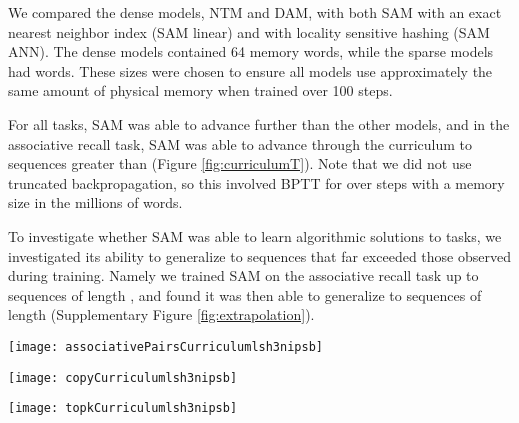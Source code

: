 \documentclass{article}
\begin{document}
We compared the dense models, NTM and DAM, with both SAM with an exact nearest neighbor index (SAM linear) and with locality sensitive hashing (SAM ANN). The dense models contained 64 memory words, while the sparse models had  words. These sizes were chosen to ensure all models use approximately the same amount of physical memory when trained over 100 steps.







For all tasks, SAM was able to advance further than the other models, and in the associative recall task, SAM was able to advance through the curriculum to sequences greater than  (Figure \ref{fig:curriculumT}). Note that we did not use truncated backpropagation, so this involved BPTT for over  steps with a memory size in the millions of words.



To investigate whether SAM was able to learn algorithmic solutions to tasks, we investigated its ability to generalize to sequences that far exceeded those observed during training. Namely we trained SAM on the associative recall task up to sequences of length , and found it was then able to generalize to sequences of length  (Supplementary Figure  \ref{fig:extrapolation}). 











\begin{figure*}[h]
\begin{minipage}[h]{0.32\textwidth}
        \centering
\texttt{[image: associativePairsCurriculumlsh3nipsb]}
        \subcaption{\label{sf:apc}}
    \end{minipage} \begin{minipage}[h]{0.32\textwidth}
        \centering
\texttt{[image: copyCurriculumlsh3nipsb]}
        \subcaption{\label{sf:cc}}
    \end{minipage} \begin{minipage}[h]{0.32\textwidth}
        \centering
\texttt{[image: topkCurriculumlsh3nipsb]}
        \subcaption{\label{sf:topkc}}
    \end{minipage}
    \\
    \caption{Curriculum training curves for sparse and dense models on () Associative recall, () Copy, and () Priority sort. Difficulty level indicates the task difficulty (e.g. the length of sequence for copy). We see SAM train (and backpropagate over) episodes with thousands of steps, and tasks which require thousands of words to be stored to memory. Each model is averaged across 5 replicas of identical hyper-parameters (light lines indicate individual runs).
    }
\label{fig:curriculumT}
\end{figure*}
\end{document}
